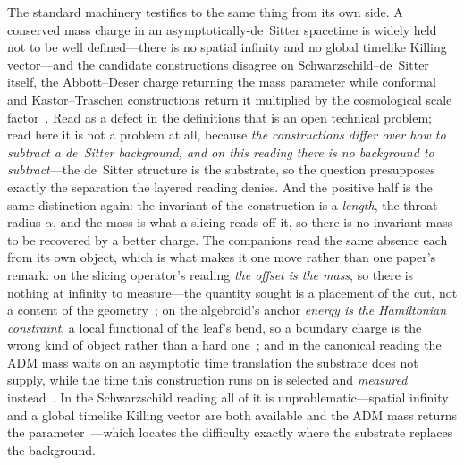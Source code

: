 \documentclass[11pt,a4paper]{article}
\theoremstyle{plain}
\theoremstyle{definition}
\theoremstyle{remark}
\begin{document}
The standard machinery testifies to the same thing from its own side. A conserved mass charge in an asymptotically-de~Sitter spacetime is widely held not to be well defined---there is no spatial infinity and no global timelike Killing vector---and the candidate constructions disagree on Schwarzschild--de~Sitter itself, the Abbott--Deser charge returning the mass parameter while conformal and Kastor--Traschen constructions return it multiplied by the cosmological scale factor~\cite{JanzenSlicing}. Read as a defect in the definitions that is an open technical problem; read here it is not a problem at all, because \emph{the constructions differ over how to subtract a de~Sitter background, and on this reading there is no background to subtract}---the de~Sitter structure is the substrate, so the question presupposes exactly the separation the layered reading denies. And the positive half is the same distinction again: the invariant of the construction is a \emph{length}, the throat radius $\alpha$, and the mass is what a slicing reads off it, so there is no invariant mass to be recovered by a better charge. The companions read the same absence each from its own object, which is what makes it one move rather than one paper's remark: on the slicing operator's reading \emph{the offset is the mass}, so there is nothing at infinity to measure---the quantity sought is a placement of the cut, not a content of the geometry~\cite{JanzenOperator}; on the algebroid's anchor \emph{energy is the Hamiltonian constraint}, a local functional of the leaf's bend, so a boundary charge is the wrong kind of object rather than a hard one~\cite{JanzenAlgebroid}; and in the canonical reading the ADM mass waits on an asymptotic time translation the substrate does not supply, while the time this construction runs on is selected and \emph{measured} instead~\cite{JanzenCanonicalTime}. In the Schwarzschild reading all of it is unproblematic---spatial infinity and a global timelike Killing vector are both available and the ADM mass returns the parameter~\cite{JanzenCircle}---which locates the difficulty exactly where the substrate replaces the background.
\end{document}
